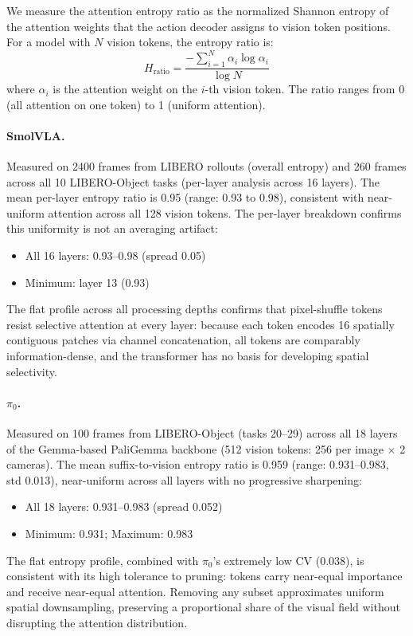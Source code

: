 We measure the attention entropy ratio as the normalized Shannon entropy of the attention weights that the action decoder assigns to vision token positions. For a model with $N$ vision tokens, the entropy ratio is:
\begin{equation}
H_{\text{ratio}} = \frac{-\sum_{i=1}^{N} \alpha_i \log \alpha_i}{\log N}
\end{equation}
where $\alpha_i$ is the attention weight on the $i$-th vision token. The ratio ranges from 0 (all attention on one token) to 1 (uniform attention).

\paragraph{SmolVLA.} Measured on 2400 frames from LIBERO rollouts (overall entropy) and 260 frames across all 10 LIBERO-Object tasks (per-layer analysis across 16 layers). The mean per-layer entropy ratio is 0.95 (range: 0.93 to 0.98), consistent with near-uniform attention across all 128 vision tokens. The per-layer breakdown confirms this uniformity is not an averaging artifact:
\begin{itemize}[nosep]
    \item All 16 layers: 0.93--0.98 (spread 0.05)
    \item Minimum: layer 13 (0.93)
\end{itemize}
The flat profile across all processing depths confirms that pixel-shuffle tokens resist selective attention at every layer: because each token encodes 16 spatially contiguous patches via channel concatenation, all tokens are comparably information-dense, and the transformer has no basis for developing spatial selectivity.

\paragraph{$\pi_{0}$.} Measured on 100 frames from LIBERO-Object (tasks 20--29) across all 18 layers of the Gemma-based PaliGemma backbone (512 vision tokens: 256 per image $\times$ 2 cameras). The mean suffix-to-vision entropy ratio is 0.959 (range: 0.931--0.983, std 0.013), near-uniform across all layers with no progressive sharpening:
\begin{itemize}[nosep]
    \item All 18 layers: 0.931--0.983 (spread 0.052)
    \item Minimum: 0.931; Maximum: 0.983
\end{itemize}
The flat entropy profile, combined with $\pi_{0}$'s extremely low CV (0.038), is consistent with its high tolerance to pruning: tokens carry near-equal importance and receive near-equal attention. Removing any subset approximates uniform spatial downsampling, preserving a proportional share of the visual field without disrupting the attention distribution.

